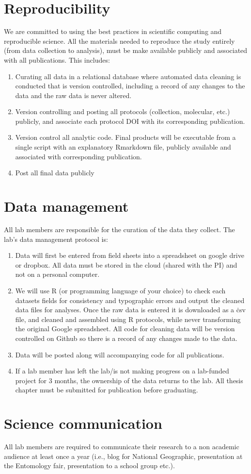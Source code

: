 \documentclass[12pt]{article}
\begin{document}
\section{Reproducibility}
We are committed to using the best practices in scientific computing
and reproducible science. All the
materials needed to reproduce the study entirely (from data collection
to analysis), must be make available publicly and associated with all
publications. This includes:
\begin{enumerate}
\item Curating all data in a relational database where automated
  data cleaning is conducted that is version controlled, including a
  record of any changes to the data and the raw data is never altered.
\item Version controlling and posting all protocols (collection,
  molecular, etc.) publicly, and associate each protocol DOI with its
  corresponding publication.
\item Version control all analytic code. Final products will be
  executable from a single script with an explanatory Rmarkdown file,
  publicly available and associated with corresponding publication.
\item Post all final data publicly
\end{enumerate}

\section{Data management}
All lab members are responsible for the curation of the data they
collect. The lab's data management protocol is:

\begin{enumerate}
\item Data will first be entered from field sheets into a spreadsheet
  on google drive or dropbox. All data must be stored in the cloud
  (shared with the PI) and not on a personal computer.
\item We will use R (or programming language of your choice) to check
  each datasets fields for consistency and typographic errors and
  output the cleaned data files for analyses. Once the raw data is entered
  it is downloaded as a \.csv file, and cleaned and
  assembled using R protocols, while never transforming the original
  Google spreadsheet. All code for cleaning data will be version
  controlled on Github so there is a record of any changes made to the
  data.
\item Data will be posted along will accompanying code for all
  publications.
\item If a lab member has left the lab/is not making progress on a
  lab-funded project for 3 months, the ownership of the data returns
  to the lab. All thesis chapter must be submitted for publication
  before graduating. 
\end{enumerate}

\section{Science communication}
All lab members are required to communicate their research to a non
academic audience at least once a year (i.e., blog for National
Geographic, presentation at the Entomology fair, presentation to a
school group etc.).
\end{document}
